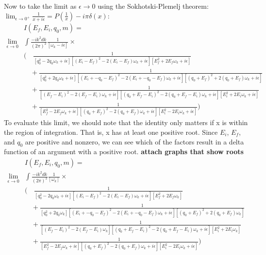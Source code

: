 Now to take the limit as $\epsilon \to 0$ using the Sokhotski-Plemelj theorem: $\lim_{\epsilon \to 0^+} \frac{1}{x+i\epsilon} = P(\frac{1}{x}) - i\pi\delta(x)$:
\begin{align*}
&I(E_f, E_i, q_0, m) = \\
\lim_{\epsilon \to 0}&\int \frac{-i k^2 d k}{(2\pi)^2}\frac{1}{\left[\omega_k - i \epsilon\right]} \times\\
&\bigg(\quad\frac{1}{
\left[q_0^2 - 2 q_0\omega_k + i\epsilon\right]
\left[(E_i - E_f)^2 - 2(E_i - E_f)\omega_k + i\epsilon\right]
\left[E_f^2 + 2 E_f\omega_k + i\epsilon\right]
} \\
&\quad + \frac{1}{
\left[q_0^2  + 2 q_0\omega_k + i\epsilon\right]
\left[(E_i + -q_0  -E_f)^2  -2(E_i + -q_0  -E_f)\omega_k + i\epsilon\right]
\left[(q_0 + E_f)^2 + 2(q_0 + E_f)\omega_k + i\epsilon\right]
} \\
&\quad + \frac{1}{
\left[(E_f - E_i)^2 - 2(E_f - E_i)\omega_k + i\epsilon\right]
\left[(q_0 + E_f - E_i)^2 - 2(q_0 + E_f - E_i)\omega_k + i\epsilon\right]
\left[E_i^2 + 2 E_i\omega_k + i\epsilon\right]
} \\
&\quad + \frac{1}{
\left[E_f^2 - 2 E_f\omega_k + i\epsilon\right]
\left[(q_0 + E_f)^2 - 2(q_0 + E_f)\omega_k + i\epsilon\right]
\left[E_i^2 - 2 E_i\omega_k + i\epsilon\right]
} \bigg)
\end{align*}
To evaluate this limit, we should note that the identity only matters if x is within the region of integration. That is, x has at least one positive root. Since $E_i$, $E_f$, and $q_0$ are positive and nonzero, we can see which of the factors result in a delta function of an argument with a positive root. \textbf{attach graphs that show roots}
\begin{align*}
&I(E_f, E_i, q_0, m) = \\
\lim_{\epsilon \to 0}&\int \frac{-i k^2 d k}{(2\pi)^2}\frac{1}{\left[\omega_k\right]} \times\\
&\bigg(\quad\frac{1}{
\left[q_0^2 - 2 q_0\omega_k + i\epsilon\right]
\left[(E_i - E_f)^2 - 2(E_i - E_f)\omega_k + i\epsilon\right]
\left[E_f^2 + 2 E_f\omega_k\right]
} \\
&\quad + \frac{1}{
\left[q_0^2  + 2 q_0\omega_k\right]
\left[(E_i + -q_0  -E_f)^2  -2(E_i + -q_0  -E_f)\omega_k + i\epsilon\right]
\left[(q_0 + E_f)^2 + 2(q_0 + E_f)\omega_k\right]
} \\
&\quad + \frac{1}{
\left[(E_f - E_i)^2 - 2(E_f - E_i)\omega_k\right]
\left[(q_0 + E_f - E_i)^2 - 2(q_0 + E_f - E_i)\omega_k + i\epsilon\right]
\left[E_i^2 + 2 E_i\omega_k\right]
} \\
&\quad + \frac{1}{
\left[E_f^2 - 2 E_f\omega_k + i\epsilon\right]
\left[(q_0 + E_f)^2 - 2(q_0 + E_f)\omega_k + i\epsilon\right]
\left[E_i^2 - 2 E_i\omega_k + i\epsilon\right]
} \bigg)
\end{align*}
